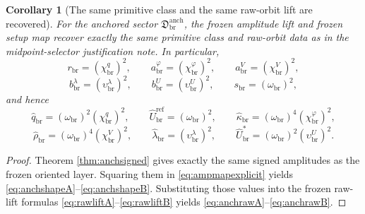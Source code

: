 \documentclass[11pt]{article}
\newcommand{\RespRawReadout}{\widehat q_{\mathrm{br}}}
\newcommand{\RespRawRef}{\widehat U_{\mathrm{br}}^{\mathrm{ref}}}
\newcommand{\RespRawCov}{\widehat\kappa_{\mathrm{br}}}
\newcommand{\RespRawRelax}{\widehat\rho_{\mathrm{br}}}
\newcommand{\RespRawWell}{\widehat\lambda_{\mathrm{br}}}
\newcommand{\RespRawEq}{\widehat U_{\mathrm{br}}^{\ast}}
\newcommand{\ScaleMod}{s_{\mathrm{br}}}
\newcommand{\PrimRead}{r_{\mathrm{br}}}
\newcommand{\PrimCovSlot}{a_{\mathrm{br}}^{\varphi}}
\newcommand{\PrimRelaxSlot}{a_{\mathrm{br}}^{V}}
\newcommand{\PrimWellSlot}{b_{\mathrm{br}}^{\lambda}}
\newcommand{\PrimEqSlot}{b_{\mathrm{br}}^{U}}
\newcommand{\AbsReadAmp}{\chi_{\mathrm{br}}^{q}}
\newcommand{\AbsCovAmp}{\chi_{\mathrm{br}}^{\varphi}}
\newcommand{\AbsRelaxAmp}{\chi_{\mathrm{br}}^{V}}
\newcommand{\AbsWellAmp}{\upsilon_{\mathrm{br}}^{\lambda}}
\newcommand{\AbsEqAmp}{\upsilon_{\mathrm{br}}^{U}}
\newcommand{\AbsScaleAmp}{\omega_{\mathrm{br}}}
\newcommand{\BalOriginSector}{\mathfrak D_{\mathrm{br}}^{\mathrm{anch}}}
\newtheorem{corollary}{Corollary}
\begin{document}
\begin{corollary}[The same primitive class and the same raw-orbit lift are recovered]
\label{cor:anchraw}
For the anchored sector \(\BalOriginSector\), the frozen amplitude lift and frozen setup map recover exactly the same primitive class and raw-orbit data as in the midpoint-selector justification note. In particular,
\begin{equation}
\PrimRead=(\AbsReadAmp)^{2},
\qquad
\PrimCovSlot=(\AbsCovAmp)^{2},
\qquad
\PrimRelaxSlot=(\AbsRelaxAmp)^{2},
\label{eq:anchshapeA}
\end{equation}
\begin{equation}
\PrimWellSlot=(\AbsWellAmp)^{2},
\qquad
\PrimEqSlot=(\AbsEqAmp)^{2},
\qquad
\ScaleMod=(\AbsScaleAmp)^{2},
\label{eq:anchshapeB}
\end{equation}
and hence
\begin{equation}
\RespRawReadout=(\AbsScaleAmp)^{2}(\AbsReadAmp)^{2},
\qquad
\RespRawRef=(\AbsScaleAmp)^{2},
\qquad
\RespRawCov=(\AbsScaleAmp)^{4}(\AbsCovAmp)^{2},
\label{eq:anchrawA}
\end{equation}
\begin{equation}
\RespRawRelax=(\AbsScaleAmp)^{4}(\AbsRelaxAmp)^{2},
\qquad
\RespRawWell=(\AbsWellAmp)^{2},
\qquad
\RespRawEq=(\AbsScaleAmp)^{2}(\AbsEqAmp)^{2}.
\label{eq:anchrawB}
\end{equation}
\end{corollary}

\begin{proof}
Theorem \ref{thm:anchsigned} gives exactly the same signed amplitudes as the frozen oriented layer. Squaring them in \eqref{eq:ampmapexplicit} yields \eqref{eq:anchshapeA}--\eqref{eq:anchshapeB}. Substituting those values into the frozen raw-lift formulas \eqref{eq:rawliftA}--\eqref{eq:rawliftB} yields \eqref{eq:anchrawA}--\eqref{eq:anchrawB}.
\end{proof}
\end{document}
